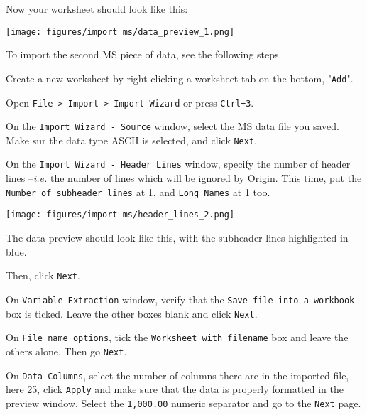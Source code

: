 \documentclass[a4paper, 11pt, raggedright, parskip]{tufte-style-article}
\begin{document}
\newpage

Now your worksheet should look like this:

\texttt{[image: figures/import ms/data\_preview\_1.png]}



To import the second MS piece of data, see the following steps.

\begin{ol}

\item Create a new worksheet by right-clicking a worksheet tab on the bottom, "\texttt{Add}".

\item Open \texttt{File > Import > Import Wizard} or press \texttt{Ctrl+3}.

\item On the \texttt{Import Wizard - Source} window, select the MS data file you saved. Make sur the data type ASCII is selected, and click \texttt{Next}.

\item On the \texttt{Import Wizard - Header Lines} window, specify the number of header lines --\textit{i.e.} the number of lines which will be ignored by Origin. This time, put the \texttt{Number of subheader lines} at 1, and \texttt{Long Names} at 1 too.

\texttt{[image: figures/import ms/header\_lines\_2.png]}

The data preview should look like this, with the subheader lines highlighted in blue.

Then, click \texttt{Next}.

\item On \texttt{Variable Extraction} window, verify that the \texttt{Save file into a workbook} box is ticked. Leave the other boxes blank and click \texttt{Next}. 

\item On \texttt{File name options}, tick the \texttt{Worksheet with filename} box and leave the others alone. Then go \texttt{Next}.

\item On \texttt{Data Columns}, select the number of columns there are in the imported file, -- here 25, click \texttt{Apply} and make sure that the data is properly formatted in the preview window. Select the \texttt{1,000.00} numeric separator and go to the \texttt{Next} page.


\end{ol}
\end{document}
